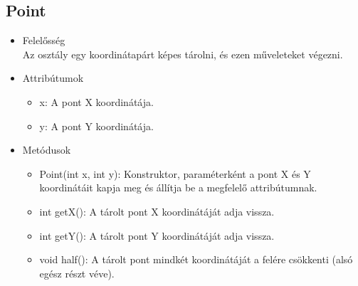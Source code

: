 \subsection{Point}
\begin{itemize}
	\item Felelősség\\
	Az osztály egy koordinátapárt képes tárolni, és ezen műveleteket végezni.
	\item Attribútumok
	\begin{itemize}
		\item x: A pont X koordinátája.
		\item y: A pont Y koordinátája.
	\end{itemize}
	\item Metódusok
	\begin{itemize}
		\item Point(int x, int y): Konstruktor, paraméterként a pont X és Y koordinátáit kapja meg és állítja be a megfelelő attribútumnak.
		\item int getX(): A tárolt pont X koordinátáját adja vissza.
		\item int getY(): A tárolt pont Y koordinátáját adja vissza.
		\item void half(): A tárolt pont mindkét koordinátáját a felére csökkenti (alsó egész részt véve).
	\end{itemize}
\end{itemize}

